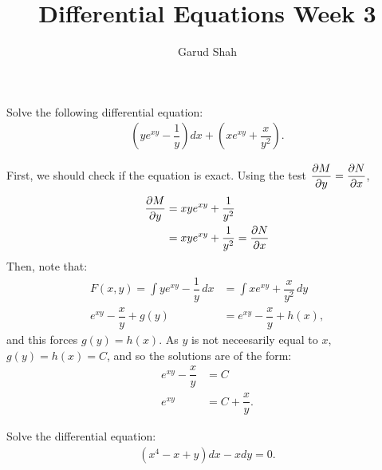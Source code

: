 \documentclass{article}
\title{Differential Equations Week 3}
\author{Garud Shah}
\begin{document}
\maketitle
\newpage
\begin{problem}[Problem 1]
    Solve the following differential equation:
    \begin{align*}
        \left( ye^{xy}-\dfrac{1}{y} \right) dx + \left(xe^{xy} + \dfrac{x}{y^2} \right).
    \end{align*}
\end{problem}
\begin{solution*}
    First, we should check if the equation is exact. Using the test $\dfrac{\partial M}{\partial y} = \dfrac{\partial N}{\partial x}$, 
    \begin{align*}
        \dfrac{\partial M}{\partial y} &= xye^{xy} + \dfrac{1}{y^2}  \\ 
        &= xye^{xy} + \dfrac{1}{y^2}= \dfrac{\partial N}{\partial x}
    \end{align*}
    Then, note that:
    \begin{align*}
        F(x,y) = \int ye^{xy}-\dfrac{1}{y}  \, dx &= \int xe^{xy} + \dfrac{x}{y^2} \, dy \\ 
        e^{xy} - \dfrac{x}{y} + g(y) &= e^{xy} - \dfrac{x}{y} + h(x),
    \end{align*}
    and this forces $g(y) = h(x)$. As $y$ is not neceesarily equal to $x$, $g(y) = h(x) = C$, and so the solutions are of the form:
    \begin{align*}
        e^{xy} - \dfrac{x}{y} &= C \\ 
        e^{xy} &= C + \dfrac{x}{y}.
    \end{align*}
\end{solution*}
\newpage
\begin{problem}[Problem 2]
    Solve the differential equation:
    \begin{align*}
        (x^4 - x + y) dx - x  dy = 0.
    \end{align*}
\end{problem}
\end{document}
